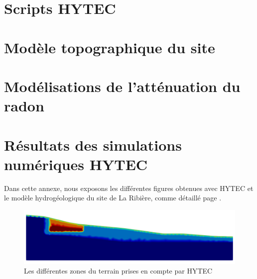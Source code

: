 \documentclass{article}
\begin{document}
\renewcommand\lstlistingname{Script n°}
\renewcommand\lstlistlistingname{}

\newpage
\section{Scripts HYTEC}
\label{lst:modele_hydro_chimie_final}

\newpage

\newpage



\newpage
\section{Modèle topographique du site}

\label{lst:modele_topo}

\newpage
\section{Modélisations de l'atténuation du radon}
\label{lst:modele_radon_1_1}


\newpage
\label{lst:modele_radon_1_2}



\newpage
\label{lst:modele_radon_2}



\newpage
\section{Résultats des simulations numériques HYTEC}
\label{annexe:modele-transport-reactive}

Dans cette annexe, nous exposons les différentes figures obtenues avec HYTEC et le modèle hydrogéologique du site de La Ribière, comme détaillé page \pageref{page:modele_hydro}.


\begin{figure}[H]
    \centering
    \includegraphics[width=\linewidth]{LJ-zones-HYTEC-final.png}
    \caption{Les différentes zones du terrain prises en compte par HYTEC}
    \label{fig:zones_HYTEC}
\end{figure}
\end{document}
